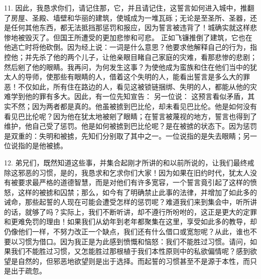 11. 因此，我恳求你们，请记住那，它，并且请记住，这誓言如何进入城中，推翻了房屋、圣殿、墙壁和华丽的建筑，使城成为一堆瓦砾；无论是至圣所、圣器，还是任何其他东西，都无法抵挡那惩罚和报应，因为誓言被违背了！城确实就这样悲惨地被毁灭了。但国王所遭受的更加悲惨和可悲。 正如飞镰推倒了建筑，它也在他逃亡时将他砍倒。因为经上说：一词是什么意思？他要求他解释自己的行为，指控他；并先杀了他的两个儿子，让他亲眼目睹自己家庭的灾难，看那悲惨的悲剧；然后剜了他的眼睛。我再问，为何发生这事？为使他成为蛮族和住在他们当中的犹太人的导师，使那些有眼睛的人，借着这个失明的人，能看出誓言是多么大的罪恶！不仅如此，所有住在路边的人，看见这被锁链捆绑、失明的人，都能从他的灾难学到他的罪有多大。因此，有一位先知宣告： 另一位说： 这预言看似矛盾，其实不然；因为两者都是真的。他虽被掳到巴比伦，却未看见巴比伦。他是如何没有看见巴比伦呢？因为他在犹太地被剜了眼睛；在誓言被蔑视的地方，誓言也得到了维护，他自己受了惩罚。他是如何被掳到巴比伦呢？是在被掳的状态下。因为惩罚是双重的：失明和被掳，先知们分别取了其中之一。一位说指的是失去眼睛；另一位说指的是他被掳。\par

12. 弟兄们，既然知道这些事，并集合起刚才所讲的和以前所说的，让我们最终戒除这邪恶的习惯，是的，我恳求和乞求你们大家！因为如果在旧约时代，犹太人没有被要求最严格的道德智慧，而是对他们有许多宽容，一个誓言竟引起了这样的愤怒，这样的被掳和囚禁；那么，如今有了明确禁止此事的法律，并增加了如此多的诫命，那些起誓的人现在可能会遭受怎样的惩罚呢？难道我们来到集会中，听所讲的话，就够了吗？实际上，我们不断听讲，却不遵行所吩咐的，这正是更大的定罪和更难免罚的理由！如果我们从幼年到老年都聚集在这里，享受如此多的教导，却仍像他们一样，不努力改正一个缺点，我们还有什么借口或宽恕呢？从此，谁也不要以习惯为借口。因为我正是为此感到愤慨和恼怒：我们不能胜过习惯。请问，如果我们不能胜过习惯，又怎能胜过那根植于我们本性原则中的私欲偏情呢？感到欲望是自然的，但邪恶地欲望则是出于选择。而起誓的习惯甚至不是源于本性，而只是出于疏忽。\par

